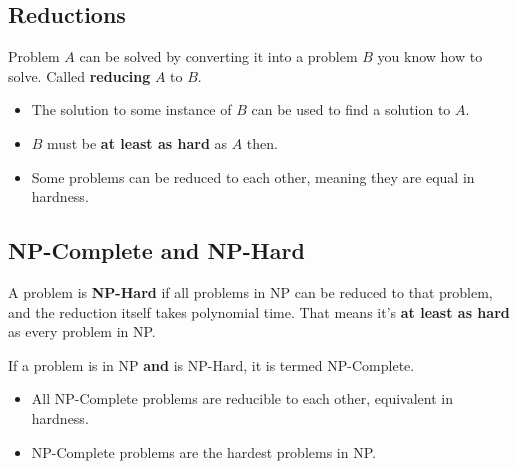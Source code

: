 \documentclass{article}
\begin{document}
\begin{minipage}[t]{0.5\textwidth}
    \subsection{Reductions}
    Problem $A$ can be solved by converting it into a problem $B$ you know how to solve. Called \textbf{reducing} $A$ to $B$.
    \begin{itemize}[noitemsep, topsep=0pt]
        \item The solution to some instance of $B$ can be used to find a solution to $A$.
        \item $B$ must be \textbf{at least as hard} as $A$ then.
        \item Some problems can be reduced to each other, meaning they are equal in hardness.
    \end{itemize}

    \subsection{NP-Complete and NP-Hard}
    A problem is \textbf{NP-Hard} if all problems in NP can be reduced to that problem, and the reduction itself takes polynomial time. That means it's \textbf{at least as hard} as every problem in NP. 
    
    If a problem is in NP \textbf{and} is NP-Hard, it is termed NP-Complete. 
    \begin{itemize}[topsep=0pt, noitemsep]
        \item All NP-Complete problems are reducible to each other, equivalent in hardness.
        \item NP-Complete problems are the hardest problems in NP.
    \end{itemize}
\end{minipage}
\end{document}
